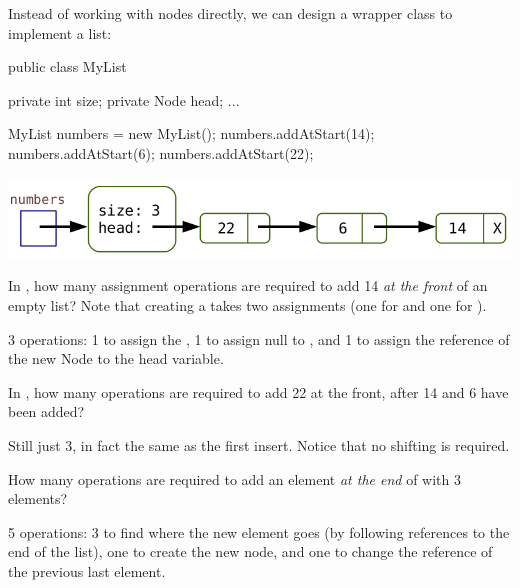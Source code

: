 Instead of working with nodes directly, we can design a wrapper class to implement a list:

\vspace{1ex}
\begin{minipage}{0.40\linewidth}
\begin{javalst}
    public class MyList {

        private int size;
        private Node head;
        ...
    }
\end{javalst}
\end{minipage}
\hfill
\begin{minipage}{0.58\linewidth}
\begin{javalst}
    MyList numbers = new MyList();
    numbers.addAtStart(14);
    numbers.addAtStart(6);
    numbers.addAtStart(22);
\end{javalst}
\includegraphics[scale=0.35]{figs/list3.png}
\end{minipage}
\vspace{1ex}




\Q In , how many assignment operations are required to add 14 {\it at the front} of an empty list? Note that creating a  takes two assignments (one for  and one for ).

\begin{answer}[3em]
3 operations: 1 to assign the , 1 to assign null to , and 1 to assign the reference of the new Node to the head variable.
\end{answer}


\Q In , how many operations are required to add 22 at the front, after 14 and 6 have been added?

\begin{answer}[3em]
Still just 3, in fact the same as the first insert. Notice that no shifting is required.
\end{answer}


\Q How many operations are required to add an element {\it at the end} of  with 3 elements?

\begin{answer}[3em]
5 operations: 3 to find where the new element goes (by following references to the end of the list), one to create the new node, and one to change the reference of the previous last element.
\end{answer}


